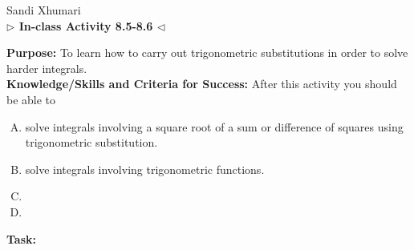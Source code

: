 \documentclass[answers]{exam}
\begin{document}
	\begin{center}
	\hfill Sandi Xhumari \\ \textbf{$\triangleright$ In-class Activity 8.5-8.6 $\triangleleft$}\\
\end{center}

\textbf{Purpose:} To learn how to carry out trigonometric substitutions in order to solve harder integrals. \\

\textbf{Knowledge/Skills and Criteria for Success:} After this activity you should be able to

\begin{enumerate}[A.]
	\item solve integrals involving a square root of a sum or difference of squares using trigonometric substitution.
	\item solve integrals involving trigonometric functions.
	\item 
	\item
	
\end{enumerate}

\textbf{Task:}
\end{document}
